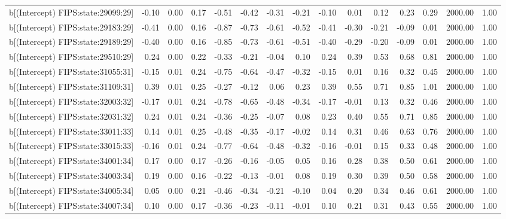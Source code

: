 \begin{table}[ht]
\begin{tabular}{rrrrrrrrrrrrrrr}
  b[(Intercept) FIPS:state:29099:29] & -0.10 & 0.00 & 0.17 & -0.51 & -0.42 & -0.31 & -0.21 & -0.10 & 0.01 & 0.12 & 0.23 & 0.29 & 2000.00 & 1.00 \\ 
  b[(Intercept) FIPS:state:29183:29] & -0.41 & 0.00 & 0.16 & -0.87 & -0.73 & -0.61 & -0.52 & -0.41 & -0.30 & -0.21 & -0.09 & 0.01 & 2000.00 & 1.00 \\ 
  b[(Intercept) FIPS:state:29189:29] & -0.40 & 0.00 & 0.16 & -0.85 & -0.73 & -0.61 & -0.51 & -0.40 & -0.29 & -0.20 & -0.09 & 0.01 & 2000.00 & 1.00 \\ 
  b[(Intercept) FIPS:state:29510:29] & 0.24 & 0.00 & 0.22 & -0.33 & -0.21 & -0.04 & 0.10 & 0.24 & 0.39 & 0.53 & 0.68 & 0.81 & 2000.00 & 1.00 \\ 
  b[(Intercept) FIPS:state:31055:31] & -0.15 & 0.01 & 0.24 & -0.75 & -0.64 & -0.47 & -0.32 & -0.15 & 0.01 & 0.16 & 0.32 & 0.45 & 2000.00 & 1.00 \\ 
  b[(Intercept) FIPS:state:31109:31] & 0.39 & 0.01 & 0.25 & -0.27 & -0.12 & 0.06 & 0.23 & 0.39 & 0.55 & 0.71 & 0.85 & 1.01 & 2000.00 & 1.00 \\ 
  b[(Intercept) FIPS:state:32003:32] & -0.17 & 0.01 & 0.24 & -0.78 & -0.65 & -0.48 & -0.34 & -0.17 & -0.01 & 0.13 & 0.32 & 0.46 & 2000.00 & 1.00 \\ 
  b[(Intercept) FIPS:state:32031:32] & 0.24 & 0.01 & 0.24 & -0.36 & -0.25 & -0.07 & 0.08 & 0.23 & 0.40 & 0.55 & 0.71 & 0.85 & 2000.00 & 1.00 \\ 
  b[(Intercept) FIPS:state:33011:33] & 0.14 & 0.01 & 0.25 & -0.48 & -0.35 & -0.17 & -0.02 & 0.14 & 0.31 & 0.46 & 0.63 & 0.76 & 2000.00 & 1.00 \\ 
  b[(Intercept) FIPS:state:33015:33] & -0.16 & 0.01 & 0.24 & -0.77 & -0.64 & -0.48 & -0.32 & -0.16 & -0.01 & 0.15 & 0.33 & 0.48 & 2000.00 & 1.00 \\ 
  b[(Intercept) FIPS:state:34001:34] & 0.17 & 0.00 & 0.17 & -0.26 & -0.16 & -0.05 & 0.05 & 0.16 & 0.28 & 0.38 & 0.50 & 0.61 & 2000.00 & 1.00 \\ 
  b[(Intercept) FIPS:state:34003:34] & 0.19 & 0.00 & 0.16 & -0.22 & -0.13 & -0.01 & 0.08 & 0.19 & 0.30 & 0.39 & 0.50 & 0.58 & 2000.00 & 1.00 \\ 
  b[(Intercept) FIPS:state:34005:34] & 0.05 & 0.00 & 0.21 & -0.46 & -0.34 & -0.21 & -0.10 & 0.04 & 0.20 & 0.34 & 0.46 & 0.61 & 2000.00 & 1.00 \\ 
  b[(Intercept) FIPS:state:34007:34] & 0.10 & 0.00 & 0.17 & -0.36 & -0.23 & -0.11 & -0.01 & 0.10 & 0.21 & 0.31 & 0.43 & 0.55 & 2000.00 & 1.00 \\ 

\end{tabular}
\end{table}
